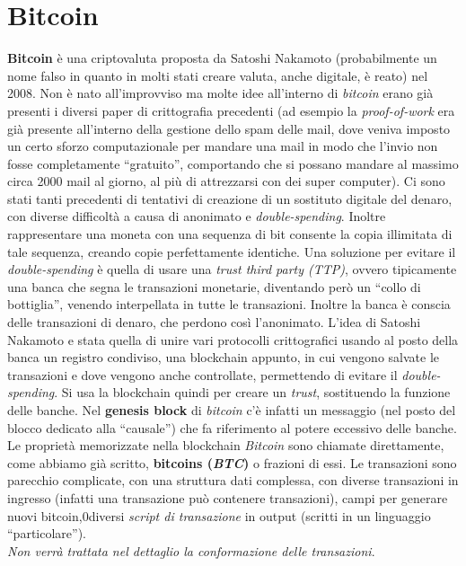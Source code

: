 \documentclass[a4paper,12pt, oneside]{book}
\begin{document}
\section{Bitcoin}
\textbf{Bitcoin} è una criptovaluta proposta da Satoshi Nakamoto
(probabilmente un nome falso in quanto in molti stati creare valuta, anche
digitale, è reato)
nel 2008. Non è nato all'improvviso ma molte idee all'interno di
\textit{bitcoin} erano già presenti i diversi paper di crittografia precedenti
(ad esempio la \textit{proof-of-work} era già presente all'interno della
gestione dello spam delle mail, dove veniva imposto un certo sforzo
computazionale per mandare una mail in modo che l'invio non fosse completamente
``gratuito'', comportando che si possano mandare al massimo circa 2000 mail al
giorno, al più di attrezzarsi con dei super computer). Ci sono stati tanti
precedenti di tentativi di creazione di un sostituto digitale del denaro, con
diverse difficoltà a causa di anonimato e \textit{double-spending}. Inoltre
rappresentare una moneta con una sequenza di bit consente la copia illimitata di
tale sequenza, creando copie perfettamente identiche. Una soluzione per evitare
il \textit{double-spending} è quella di usare una \textit{trust third party
  (TTP)}, ovvero tipicamente una banca che
segna le transazioni monetarie, diventando però un ``collo di bottiglia'',
venendo interpellata in tutte le transazioni. Inoltre la banca è conscia delle
transazioni di denaro, che perdono così l'anonimato. L'idea di Satoshi Nakamoto
e stata quella di unire vari protocolli crittografici usando al posto della
banca un registro condiviso, una blockchain appunto, in cui vengono salvate le
transazioni e dove vengono anche controllate, permettendo di evitare il
\textit{double-spending}. Si usa la blockchain quindi per creare un
\textit{trust}, sostituendo la funzione delle banche. Nel \textbf{genesis block}
di \textit{bitcoin} c'è infatti un messaggio (nel posto del blocco dedicato alla
``causale'') che fa riferimento al potere eccessivo delle banche.\\
Le proprietà memorizzate nella blockchain \textit{Bitcoin} sono chiamate
direttamente, come abbiamo già scritto, \textbf{bitcoins (\textit{BTC})} o
frazioni di essi. Le transazioni sono parecchio complicate, con una struttura
dati complessa, con diverse transazioni in ingresso (infatti una transazione può
contenere transazioni), campi per generare nuovi bitcoin,0diversi \textit{script
  di transazione} in output (scritti in un linguaggio ``particolare''). \\
\textit{Non verrà trattata nel dettaglio la conformazione delle transazioni}.\\
\end{document}
